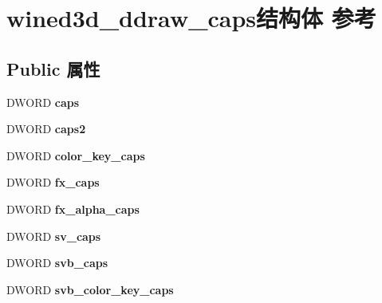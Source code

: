 \hypertarget{structwined3d__ddraw__caps}{}\section{wined3d\+\_\+ddraw\+\_\+caps结构体 参考}
\label{structwined3d__ddraw__caps}
\subsection*{Public 属性}
\begin{DoxyCompactItemize}
\item 
\mbox{\label{structwined3d__ddraw__caps_ae5f2025114de916c23a1e46da95e29bb}} 
D\+W\+O\+RD {\bfseries caps}
\item 
\mbox{\label{structwined3d__ddraw__caps_a101cd44050a59d21b47d73f0a9446723}} 
D\+W\+O\+RD {\bfseries caps2}
\item 
\mbox{\label{structwined3d__ddraw__caps_a32c7e6b343d28fdf4cda1c9d1221aef2}} 
D\+W\+O\+RD {\bfseries color\+\_\+key\+\_\+caps}
\item 
\mbox{\label{structwined3d__ddraw__caps_a99a71d849f96ae90a243bb14504c6576}} 
D\+W\+O\+RD {\bfseries fx\+\_\+caps}
\item 
\mbox{\label{structwined3d__ddraw__caps_ad7f885bf976342aed9c30d8d5eef5fdf}} 
D\+W\+O\+RD {\bfseries fx\+\_\+alpha\+\_\+caps}
\item 
\mbox{\label{structwined3d__ddraw__caps_a7cffedb07b359f1f39bb6925c9dbacb7}} 
D\+W\+O\+RD {\bfseries sv\+\_\+caps}
\item 
\mbox{\label{structwined3d__ddraw__caps_a4defe628dd981f0259428407020b2aa6}} 
D\+W\+O\+RD {\bfseries svb\+\_\+caps}
\item 
\mbox{\label{structwined3d__ddraw__caps_adc8fad5ead87ae0b7454893e9bed6986}} 
D\+W\+O\+RD {\bfseries svb\+\_\+color\+\_\+key\+\_\+caps}
\item 
\mbox{\label{structwined3d__ddraw__caps_a57e09c913fc57ac15e7d05e05d46178c}} 

\end{DoxyCompactItemize}

